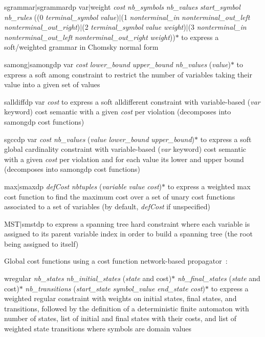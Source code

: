 \documentclass{article}
\begin{document}
\begin{DoxyItemize}
\begin{DoxyItemize}
\item sgrammar$\vert$sgrammardp var$\vert$weight {\itshape cost} {\itshape nb\-\_\-symbols} {\itshape nb\-\_\-values} {\itshape start\-\_\-symbol} {\itshape nb\-\_\-rules} ((0 {\itshape terminal\-\_\-symbol} {\itshape value})$\vert$(1 {\itshape nonterminal\-\_\-in} {\itshape nonterminal\-\_\-out\-\_\-left} {\itshape nonterminal\-\_\-out\-\_\-right})$\vert$(2 {\itshape terminal\-\_\-symbol} {\itshape value} {\itshape weight})$\vert$(3 {\itshape nonterminal\-\_\-in} {\itshape nonterminal\-\_\-out\-\_\-left} {\itshape nonterminal\-\_\-out\-\_\-right} {\itshape weight}))$\ast$ to express a soft/weighted grammar in Chomsky normal form
\item samong$\vert$samongdp var {\itshape cost} {\itshape lower\-\_\-bound} {\itshape upper\-\_\-bound} {\itshape nb\-\_\-values} ({\itshape value})$\ast$ to express a soft among constraint to restrict the number of variables taking their value into a given set of values
\item salldiffdp var {\itshape cost} to express a soft alldifferent constraint with variable-\/based ({\itshape var} keyword) cost semantic with a given {\itshape cost} per violation (decomposes into samongdp cost functions)
\item sgccdp var {\itshape cost} {\itshape nb\-\_\-values} ({\itshape value} {\itshape lower\-\_\-bound} {\itshape upper\-\_\-bound})$\ast$ to express a soft global cardinality constraint with variable-\/based ({\itshape var} keyword) cost semantic with a given {\itshape cost} per violation and for each value its lower and upper bound (decomposes into samongdp cost functions)
\item max$\vert$smaxdp {\itshape def\-Cost} {\itshape nbtuples} ({\itshape variable} {\itshape value} {\itshape cost})$\ast$ to express a weighted max cost function to find the maximum cost over a set of unary cost functions associated to a set of variables (by default, {\itshape def\-Cost} if unspecified)
\item M\-S\-T$\vert$smstdp to express a spanning tree hard constraint where each variable is assigned to its parent variable index in order to build a spanning tree (the root being assigned to itself)
\end{DoxyItemize}
\item Global cost functions using a cost function network-\/based propagator\-~\cite{Ficolofo2012}:
\begin{DoxyItemize}
\item wregular {\itshape nb\-\_\-states} {\itshape nb\-\_\-initial\-\_\-states} ({\itshape state} and cost)$\ast$ {\itshape nb\-\_\-final\-\_\-states} ({\itshape state} and cost)$\ast$ {\itshape nb\-\_\-transitions} ({\itshape start\-\_\-state} {\itshape symbol\-\_\-value} {\itshape end\-\_\-state} {\itshape cost})$\ast$ to express a weighted regular constraint with weights on initial states, final states, and transitions, followed by the definition of a deterministic finite automaton with number of states, list of initial and final states with their costs, and list of weighted state transitions where symbols are domain values

\end{DoxyItemize}
\end{DoxyItemize}
\end{document}
